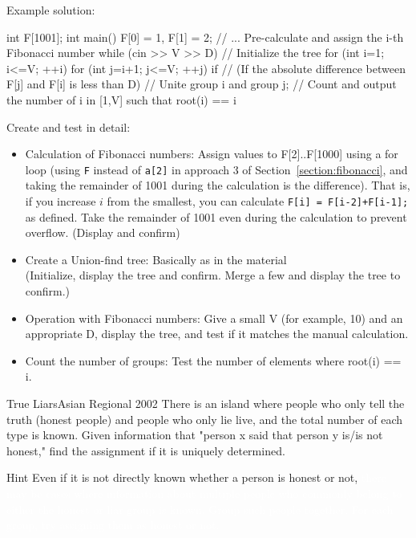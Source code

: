 Example solution:
\begin{cbox}
int F[1001];
int main() {
    F[0] = 1, F[1] = 2;
    // ... Pre-calculate and assign the i-th Fibonacci number %
    while (cin >> V >> D) {
        // Initialize the tree
        for (int i=1; i<=V; ++i)
            for (int j=i+1; j<=V; ++j)
                if // (If the absolute difference between F[j] and F[i] is less than D)
                    // Unite group i and group j;
        // Count and output the number of i in [1,V] such that root(i) == i
    }
}  
\end{cbox}

Create and test in detail:
\begin{itemize}
\setlength{\itemsep}{0pt}
\item Calculation of Fibonacci numbers: Assign values to F[2]..F[1000] using a for loop (using \texttt{F} instead of \texttt{a[2]} in approach 3 of Section~\ref{section:fibonacci}, and taking the remainder of 1001 during the calculation is the difference).
That is, if you increase $i$ from the smallest, you can calculate \texttt{F[i] = F[i-2]+F[i-1];} as defined. Take the remainder of 1001 even during the calculation to prevent overflow.
(Display and confirm)
\item Create a Union-find tree: Basically as in the material\\
(Initialize, display the tree and confirm. Merge a few and display the tree to confirm.)
\item Operation with Fibonacci numbers: Give a small V (for example, 10) and an appropriate D,
  display the tree, and test if it matches the manual calculation.
\item Count the number of groups: Test the number of elements where root(i) == i.
\end{itemize}


\begin{pbox}{True Liars}{Asian Regional 2002}
There is an island where people who only tell the truth (honest people) and people who only lie live, and the total number of each type is known.
Given information that "person x said that person y is/is not honest," find the assignment if it is uniquely determined.

\end{pbox}

\begin{tipsbox}{Hint}
Even if it is not directly known whether a person is honest or not, \textcolor{white}{there may be cases where information about multiple people who commonly belong to either the honest or liar group is known. Group such people together. For each group, try assigning them as honest or not.}
\end{tipsbox}

